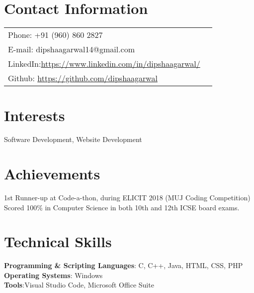 \documentclass[margin,line]{res}
\begin{document}
  

\address{\LARGE Software Development Intern}

 


\begin{resume}


\section{\sc Contact Information}

\vspace{.05in}
\begin{tabular}{@{}p{3.5in}p{3in}}
  {Phone:}  +91 (960) 860 2827 \\
  {E-mail:}  dipshaagarwal14@gmail.com\\
  {LinkedIn:}\url{https://www.linkedin.com/in/dipshaagarwal/}\\
  {Github:} \url{https://github.com/dipshaagarwal}\\

\end{tabular}



\section{\sc Interests}

Software Development, Website Development \\

\section{\sc Achievements}
1st Runner-up at Code-a-thon, during ELICIT 2018 (MUJ Coding Competition) \\
Scored 100\% in Computer Science in both 10th and 12th ICSE board exams.\\





\section{\sc Technical Skills}
{\bf Programming \& Scripting Languages}:  C, C++, Java, HTML, CSS, PHP\\
{\bf Operating Systems}: Windows\\
{\bf Tools}:Visual Studio Code, Microsoft Office Suite  \\ 



\end{resume}
\end{document}
